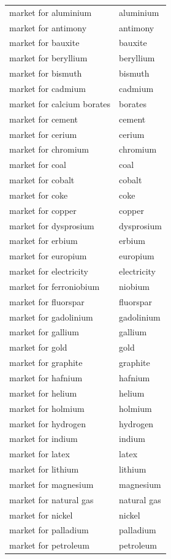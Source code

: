 \documentclass{article}
\begin{document}
\begin{longtable}{ll}
market for aluminium & aluminium \\
market for antimony & antimony \\
market for bauxite & bauxite \\
market for beryllium & beryllium \\
market for bismuth & bismuth \\
market for cadmium & cadmium \\
market for calcium borates & borates \\
market for cement & cement \\
market for cerium & cerium \\
market for chromium & chromium \\
market for coal & coal \\
market for cobalt & cobalt \\
market for coke & coke \\
market for copper & copper \\
market for dysprosium & dysprosium \\
market for erbium & erbium \\
market for europium & europium \\
market for electricity & electricity \\
market for ferroniobium & niobium \\
market for fluorspar & fluorspar \\
market for gadolinium & gadolinium \\
market for gallium & gallium \\
market for gold & gold \\
market for graphite & graphite \\
market for hafnium & hafnium \\
market for helium & helium \\
market for holmium & holmium \\
market for hydrogen & hydrogen \\
market for indium & indium \\
market for latex & latex \\
market for lithium & lithium \\
market for magnesium & magnesium \\
market for natural gas & natural gas \\
market for nickel & nickel \\
market for palladium & palladium \\
market for petroleum & petroleum \\

\end{longtable}
\end{document}
